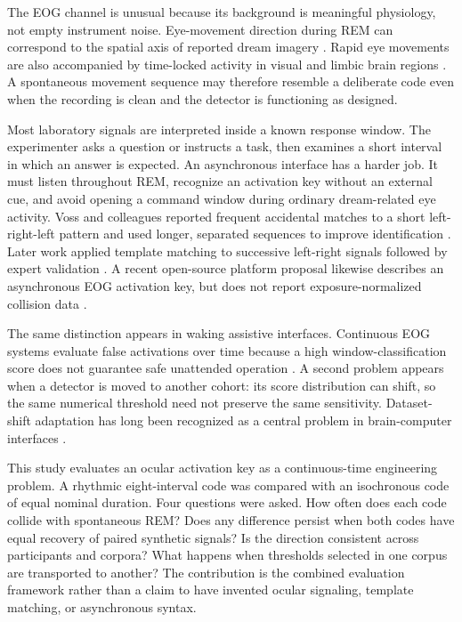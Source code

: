 \documentclass[10pt,twocolumn]{article}
\begin{document}
The EOG channel is unusual because its background is meaningful physiology, not empty instrument noise. Eye-movement direction during REM can correspond to the spatial axis of reported dream imagery \citep{herman1984}. Rapid eye movements are also accompanied by time-locked activity in visual and limbic brain regions \citep{miyauchi2009}. A spontaneous movement sequence may therefore resemble a deliberate code even when the recording is clean and the detector is functioning as designed.

Most laboratory signals are interpreted inside a known response window. The experimenter asks a question or instructs a task, then examines a short interval in which an answer is expected. An asynchronous interface has a harder job. It must listen throughout REM, recognize an activation key without an external cue, and avoid opening a command window during ordinary dream-related eye activity. Voss and colleagues reported frequent accidental matches to a short left-right-left pattern and used longer, separated sequences to improve identification \citep{voss2009}. Later work applied template matching to successive left-right signals followed by expert validation \citep{laberge2018}. A recent open-source platform proposal likewise describes an asynchronous EOG activation key, but does not report exposure-normalized collision data \citep{pinakhina2026}.

The same distinction appears in waking assistive interfaces. Continuous EOG systems evaluate false activations over time because a high window-classification score does not guarantee safe unattended operation \citep{wang2014,fang2018}. A second problem appears when a detector is moved to another cohort: its score distribution can shift, so the same numerical threshold need not preserve the same sensitivity. Dataset-shift adaptation has long been recognized as a central problem in brain-computer interfaces \citep{sugiyama2007}.

This study evaluates an ocular activation key as a continuous-time engineering problem. A rhythmic eight-interval code was compared with an isochronous code of equal nominal duration. Four questions were asked. How often does each code collide with spontaneous REM? Does any difference persist when both codes have equal recovery of paired synthetic signals? Is the direction consistent across participants and corpora? What happens when thresholds selected in one corpus are transported to another? The contribution is the combined evaluation framework rather than a claim to have invented ocular signaling, template matching, or asynchronous syntax.
\end{document}
